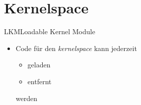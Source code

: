 \documentclass{beamer}
\begin{document}
%

\section{Kernelspace}
\begin{frame}{LKM}{Loadable Kernel Module}
 \begin{itemize}
  \item  Code für den {\em kernelspace} kann jederzeit 
   \begin{itemize}
    \item geladen
    \item entfernt
   \end{itemize} 
  werden
 \end{itemize}
\end{frame}


\end{document}
